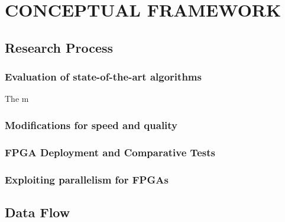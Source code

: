 
\chapter{CONCEPTUAL FRAMEWORK} %

\label{Chapter3} %



\section{Research Process}




\subsection{Evaluation of state-of-the-art algorithms}
The m


\subsection{Modifications for speed and quality}



\subsection{FPGA Deployment and Comparative Tests}

\subsection{Exploiting parallelism for FPGAs}

\section{Data Flow}